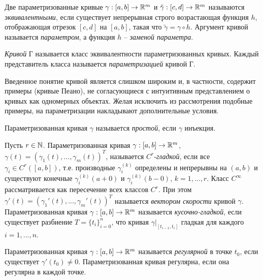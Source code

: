     \begin{definition}
        Две параметризованные кривые $\gamma: [a, b] \to \mathbb{R}^m$ и $\tilde\gamma: [c, d] \to \mathbb{R}^m$ называются \textit{эквивалентными}, если существует непрерывная строго возрастающая функция $h$, отображающая отрезок $[c, d]$ на $[a, b]$, такая что $\tilde\gamma = \gamma \circ h$. Аргумент кривой называется \textit{параметром}, а функция $h$ -- \textit{заменой параметра}.
    \end{definition}
    
    \begin{definition}
        \textit{Кривой} Г называется класс эквивалентности параметризованных кривых. Каждый представитель класса называется \textit{параметризацией} кривой Г.
    \end{definition}
    
    Введенное понятие кривой является слишком широким и, в частности, содержит примеры (кривые Пеано), не согласующиеся с интуитивным представлением о кривых как одномерных объектах. Желая исключить из рассмотрения подобные примеры, на параметризации накладывают дополнительные условия.
    
    \begin{definition}
        Параметризованная кривая $\gamma$ называется \textit{простой}, если $\gamma$ инъекция.
    \end{definition}
    
    \begin{definition}
        Пусть $r \in \mathbb{N}$. Параметризованная кривая $\gamma: [a, b] \to \mathbb{R}^m$, $\gamma(t) = (\gamma_{1}(t), ... , \gamma_{m}(t))^{T}$, называется $C^{r}$-\textit{гладкой}, если все $\gamma_{i} \in C^{r}([a, b])$, т.е. производные $\gamma_{i}^{(k)}$ определены и непрерывны на $(a, b)$ и существуют конечные $\gamma_{i}^{(k)}(a + 0)$ и $\gamma_{i}^{(k)}(b - 0)$, $k = 1, ... , r$. Класс $C^{\infty}$ рассматривается как пересечение всех классов $C^{r}$. При этом $\gamma'(t) = (\gamma_{1}'(t), ... , \gamma_{m}'(t))^{T}$ называется \textit{вектором скорости} кривой $\gamma$. Параметризованная кривая $\gamma: [a, b] \to \mathbb{R}^m$ называется \textit{кусочно-гладкой}, если существует разбиение $T = \{t_{i}\}_{i = 0}^{n}$, что кривая $\gamma|_{[t_{i-1}, t_{i}]}$ гладкая для каждого $i = 1, ... , n$.
    \end{definition}
    
    \begin{definition}
        Параметризованная кривая $\gamma: [a, b] \to \mathbb{R}^m$ называется \textit{регулярной} в точке $t_{0}$, если существует $\gamma'(t_{0}) \neq 0$. Параметризованная кривая регулярна, если она регулярна в каждой точке.
    \end{definition}
    
